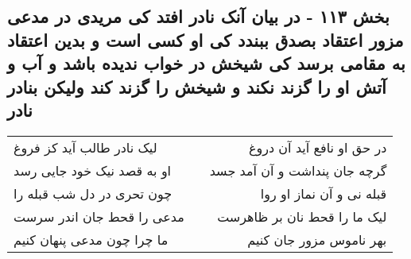 \begin{center}
\section*{بخش ۱۱۳ - در بیان آنک نادر افتد کی مریدی در مدعی مزور اعتقاد بصدق ببندد کی او کسی است و بدین اعتقاد به مقامی برسد کی شیخش در خواب ندیده باشد و آب و آتش او را گزند نکند و شیخش را گزند کند ولیکن بنادر نادر}
\label{sec:sh113}
\begin{longtable}{l p{0.5cm} r}
لیک نادر طالب آید کز فروغ
&&
در حق او نافع آید آن دروغ
\\
او به قصد نیک خود جایی رسد
&&
گرچه جان پنداشت و آن آمد جسد
\\
چون تحری در دل شب قبله را
&&
قبله نی و آن نماز او روا
\\
مدعی را قحط جان اندر سرست
&&
لیک ما را قحط نان بر ظاهرست
\\
ما چرا چون مدعی پنهان کنیم
&&
بهر ناموس مزور جان کنیم
\\
\end{longtable}
\end{center}
